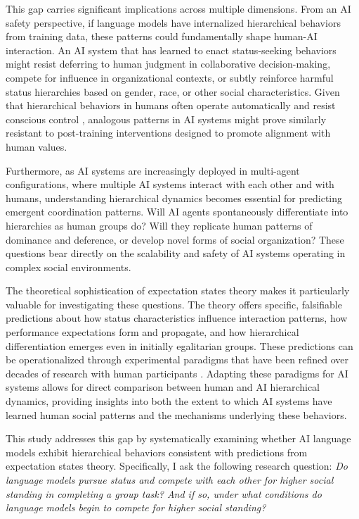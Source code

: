 This gap carries significant implications across multiple dimensions. From an AI safety perspective, if language models have internalized hierarchical behaviors from training data, these patterns could fundamentally shape human-AI interaction. An AI system that has learned to enact status-seeking behaviors might resist deferring to human judgment in collaborative decision-making, compete for influence in organizational contexts, or subtly reinforce harmful status hierarchies based on gender, race, or other social characteristics. Given that hierarchical behaviors in humans often operate automatically and resist conscious control \citep{Ridgeway-2019-Status}, analogous patterns in AI systems might prove similarly resistant to post-training interventions designed to promote alignment with human values.

Furthermore, as AI systems are increasingly deployed in multi-agent configurations, where multiple AI systems interact with each other and with humans, understanding hierarchical dynamics becomes essential for predicting emergent coordination patterns. Will AI agents spontaneously differentiate into hierarchies as human groups do? Will they replicate human patterns of dominance and deference, or develop novel forms of social organization? These questions bear directly on the scalability and safety of AI systems operating in complex social environments.

The theoretical sophistication of expectation states theory makes it particularly valuable for investigating these questions. The theory offers specific, falsifiable predictions about how status characteristics influence interaction patterns, how performance expectations form and propagate, and how hierarchical differentiation emerges even in initially egalitarian groups. These predictions can be operationalized through experimental paradigms that have been refined over decades of research with human participants \citep{Berger-1974-ExpectationStatesTheory, Berger-1980-Status}. Adapting these paradigms for AI systems allows for direct comparison between human and AI hierarchical dynamics, providing insights into both the extent to which AI systems have learned human social patterns and the mechanisms underlying these behaviors.

This study addresses this gap by systematically examining whether AI language models exhibit hierarchical behaviors consistent with predictions from expectation states theory. Specifically, I ask the following research question: \textit{Do language models pursue status and compete with each other for higher social standing in completing a group task? And if so, under what conditions do language models begin to compete for higher social standing?}


